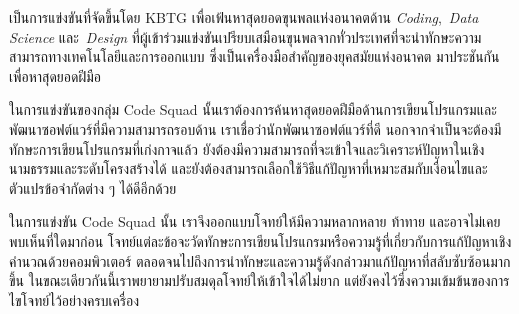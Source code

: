 
\vphantom{}%
{\techjam}\;\; เป็นการแข่งขันที่จัดขึ้นโดย {\ltspc KBTG} เพื่อเฟ้นหาสุดยอดขุนพลแห่งอนาคตด้าน
\textit{Coding},\, \textit{Data Science} และ\, \textit{Design} 
ที่ผู้เข้าร่วมแข่งขันเปรียบเสมือนขุนพลจากทั่วประเทศที่จะนำทักษะความสามารถทางเทคโนโลยีและการออกแบบ
ซึ่งเป็นเครื่องมือสำคัญของยุคสมัยแห่งอนาคต มาประชันกันเพื่อหาสุดยอดฝีมือ

ในการแข่งขันของกลุ่ม Code Squad นั้นเราต้องการค้นหาสุดยอดฝีมือด้านการเขียนโปรแกรมและพัฒนาซอฟต์แวร์ที่มีความสามารถรอบด้าน\;
เราเชื่อว่านักพัฒนาซอฟต์แวร์ที่ดี นอกจากจำเป็นจะต้องมีทักษะการเขียนโปรแกรมที่เก่งกาจแล้ว
ยังต้องมีความสามารถที่จะเข้าใจและวิเคราะห์ปัญหาในเชิงนามธรรมและระดับโครงสร้างได้
และยังต้องสามารถเลือกใช้วิธีแก้ปัญหาที่เหมาะสมกับเงื่อนไขและตัวแปรข้อจำกัดต่าง ๆ ได้ดีอีกด้วย

ในการแข่งขัน Code Squad นั้น เราจึงออกแบบโจทย์ให้มีความหลากหลาย ท้าทาย และอาจไม่เคยพบเห็นที่ใดมาก่อน\;
โจทย์แต่ละข้อจะวัดทักษะการเขียนโปรแกรมหรือความรู้ที่เกี่ยวกับการแก้ปัญหาเชิงคำนวณด้วยคอมพิวเตอร์
ตลอดจนไปถึงการนำทักษะและความรู้ดังกล่าวมาแก้ปัญหาที่สลับซับซ้อนมากขึ้น\;
ในขณะเดียวกันนี้เราพยายามปรับสมดุลโจทย์ให้เข้าใจได้ไม่ยาก แต่ยังคงไว้ซึ่งความเข้มข้นของการไขโจทย์ไว้อย่างครบเครื่อง


